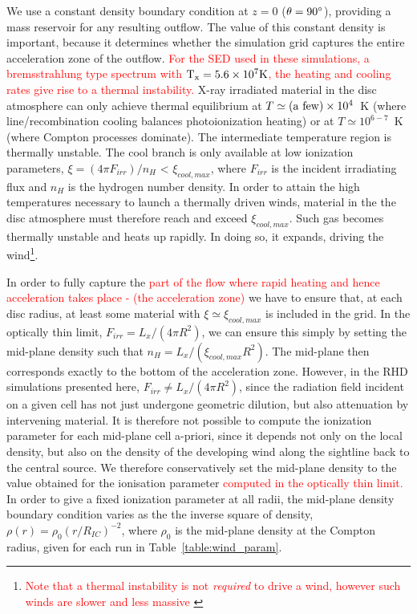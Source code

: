 \documentclass[a4paper,fleqn,usenatbib]{mnras}
\begin{document}
We use a constant 
density boundary condition at $z = 0$ ($\theta=90\degree$), providing
a mass reservoir for any resulting outflow.
The value of this constant density is important, because it determines
whether the simulation grid captures the entire acceleration zone of
the outflow. \textcolor{red}{For the SED used in these simulations, a bremsstrahlung
type spectrum with $\rm{T_x=5.6\times10^7K}$, the heating and cooling 
rates give rise to a thermal instability.}  X-ray irradiated
material in the disc atmosphere can only achieve thermal equilibrium
at $T \simeq ({\rm a~few}) \times 10^4$~K (where line/recombination
cooling balances photoionization heating) or at $T \simeq 10^{6-7}$~K
(where Compton processes dominate). The intermediate temperature
region is thermally unstable. The cool branch is only available at low 
ionization parameters, $\xi = (4\pi F_{irr}) / n_H$ < $\xi_{cool,max}$,
where $F_{irr}$ is the incident irradiating flux and $n_H$ is the
hydrogen number density. In order to attain the high temperatures 
necessary to launch a
thermally driven winds, material in the the disc atmosphere must
therefore reach and exceed $\xi_{cool,max}$. Such gas becomes
thermally unstable and heats up rapidly. In doing so, it expands,
driving the wind\footnote{\textcolor{red}{Note that a thermal
instability is not \emph{required} to drive a wind, however such 
winds are slower and less massive \citep{2015ApJ...807..107H}}}.


In order to fully capture the \textcolor{red}{part of the flow where rapid 
heating and hence acceleration takes place - (the acceleration zone)}
 we have
to ensure that, at each disc radius, at least some material with $\xi \simeq
\xi_{cool,max}$ is included in the grid.
 In the optically thin limit,
$F_{irr} = L_x / (4\pi R^2)$, we can ensure this simply by setting the 
mid-plane density such that $n_H = L_x / (\xi_{cool,max} R^2)$. The
mid-plane then corresponds exactly to the bottom of the acceleration
zone.
However, in the RHD simulations presented here, $F_{irr} \neq L_x /
(4\pi R^2)$, since the radiation field incident on a given cell has
not just undergone geometric dilution, but also attenuation by
intervening material. It is therefore not possible to  
compute the ionization parameter for each mid-plane cell a-priori, since it
depends not only on the local density, but also on the density of the
developing wind along the sightline back to the central source. We
therefore conservatively set the mid-plane density to the value
obtained for the ionisation parameter \textcolor{red}{computed in the 
optically thin limit.}  In order to give
a fixed ionization parameter at all radii, the mid-plane density boundary
condition varies as the
the inverse square of density, $\rho(r)=\rho_0(r/R_{IC})^{-2}$, where 
$\rho_0$ is the mid-plane density at the Compton radius, given for each run in
Table~\ref{table:wind_param}.
\end{document}
